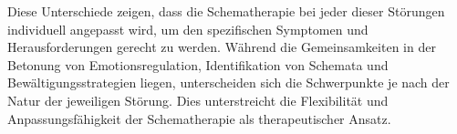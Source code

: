 Diese Unterschiede zeigen, dass die Schematherapie bei jeder dieser Störungen individuell angepasst wird, um den spezifischen Symptomen und Herausforderungen gerecht zu werden. Während die Gemeinsamkeiten in der Betonung von Emotionsregulation, Identifikation von Schemata und Bewältigungsstrategien liegen, unterscheiden sich die Schwerpunkte je nach der Natur der jeweiligen Störung. Dies unterstreicht die Flexibilität und Anpassungsfähigkeit der Schematherapie als therapeutischer Ansatz.